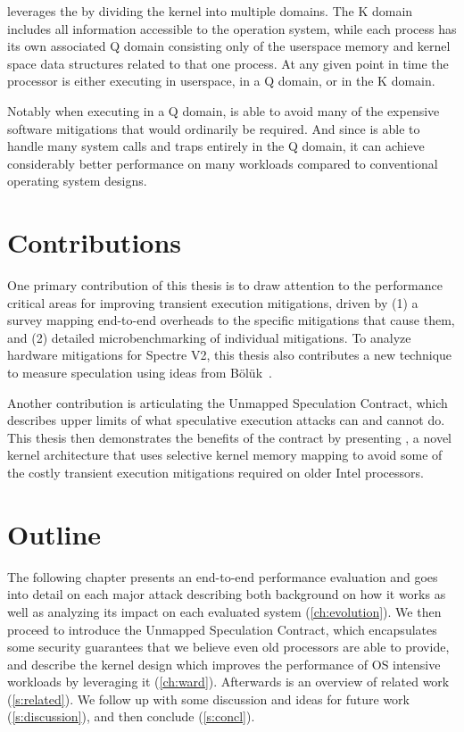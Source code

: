 \sys leverages the \contract by dividing the kernel into multiple domains.
The K domain includes all information accessible to the operation system, while each process has its own associated Q domain consisting only of the userspace memory and kernel space data structures related to that one process.
At any given point in time the processor is either executing in userspace, in a Q domain, or in the K domain. 

Notably when executing in a Q domain, \sys is able to avoid many of the expensive software mitigations that would ordinarily be required.
And since \sys is able to handle many system calls and traps entirely in the Q domain, it can achieve considerably better performance on many workloads compared to conventional operating system designs.

\section{Contributions}

One primary contribution of this thesis is to draw attention to the performance critical areas for improving transient execution mitigations, driven by 
(1) a survey mapping end-to-end overheads to the specific mitigations that cause them, and 
(2) detailed microbenchmarking of individual mitigations.
To analyze hardware mitigations for Spectre V2, this thesis also contributes a new technique to measure speculation using ideas from Bölük~\cite{speculating-x86}.

Another contribution is articulating the Unmapped Speculation Contract, which describes upper limits of what speculative execution attacks can and cannot do.
This thesis then demonstrates the benefits of the contract
by presenting \sys{}, a novel kernel architecture that uses
selective kernel memory mapping to avoid some of the costly transient execution
mitigations required on older Intel processors.

\section{Outline}
The following chapter presents an end-to-end performance evaluation and goes into detail on each major attack describing both background on how it works as well as analyzing its impact on each evaluated system (\autoref{ch:evolution}).
We then proceed to introduce the Unmapped Speculation Contract, which encapsulates some security guarantees that we believe even old processors are able to provide, and describe the \sys kernel design which improves the performance of OS intensive workloads by leveraging it (\autoref{ch:ward}).
Afterwards is an overview of related work (\autoref{s:related}).
We follow up with some discussion and ideas for future work (\autoref{s:discussion}), and then conclude (\autoref{s:concl}).
